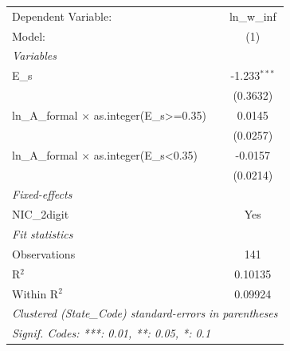 
\begingroup
\centering
\begin{tabular}{lc}
   \tabularnewline \midrule \midrule
   Dependent Variable:                               & ln\_w\_inf\\    
   Model:                                            & (1)\\  
   \midrule
   \emph{Variables}\\
   E\_s                                              & -1.233$^{***}$\\   
                                                     & (0.3632)\\   
   ln\_A\_formal $\times$ as.integer(E\_s>=0.35)     & 0.0145\\   
                                                     & (0.0257)\\   
   ln\_A\_formal $\times$ as.integer(E\_s<0.35)      & -0.0157\\   
                                                     & (0.0214)\\   
   \midrule
   \emph{Fixed-effects}\\
   NIC\_2digit                                       & Yes\\  
   \midrule
   \emph{Fit statistics}\\
   Observations                                      & 141\\  
   R$^2$                                             & 0.10135\\  
   Within R$^2$                                      & 0.09924\\  
   \midrule \midrule
   \multicolumn{2}{l}{\emph{Clustered (State\_Code) standard-errors in parentheses}}\\
   \multicolumn{2}{l}{\emph{Signif. Codes: ***: 0.01, **: 0.05, *: 0.1}}\\
\end{tabular}
\par\endgroup


